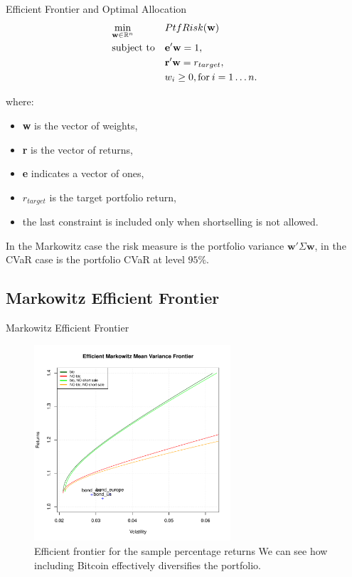 \documentclass{beamer}
\begin{document}
\begin{frame}{Efficient  Frontier and Optimal Allocation}
\begin{subequations}
	\begin{align}
	&\!\min_{\mathbf{w}\in \mathbb{R}^{n}}        & & PtfRisk(\mathbf{w}) \notag\\
	& \text{subject to} &      & \mathbf{e}'\mathbf{w} = 1 , \notag\\
	&                  &      & \mathbf{r}'\mathbf{w} = r_{target},\label{eq:constraint2} \notag\\
	&		 &        & w_{i} \geq 0, \text{for} \: i = 1\dots n. \notag
	\end{align}
\end{subequations}

where:
\begin{itemize}
	\item \textbf{w} is the vector of weights,
	\item \textbf{r} is the vector of returns,
	\item \textbf{e} indicates a vector of ones,
	\item $r_{target}$ is the target portfolio return,
	\item the last constraint is included only when shortselling is not allowed.
\end{itemize}

In the Markowitz case the risk measure is the portfolio variance $\mathbf{w}'\Sigma \mathbf{w}$, in the CVaR case is the portfolio CVaR at level $95\%$.
\end{frame}

\subsection{Markowitz Efficient Frontier}

\begin{frame}{Markowitz Efficient Frontier}
\begin{figure}
\includegraphics[width=0.65\textwidth]{frontier_markowitz_sample_percentage.pdf}
\caption{Efficient frontier for the sample percentage returns We can see how including Bitcoin effectively diversifies the portfolio.}
\end{figure}
\end{frame}
\end{document}
